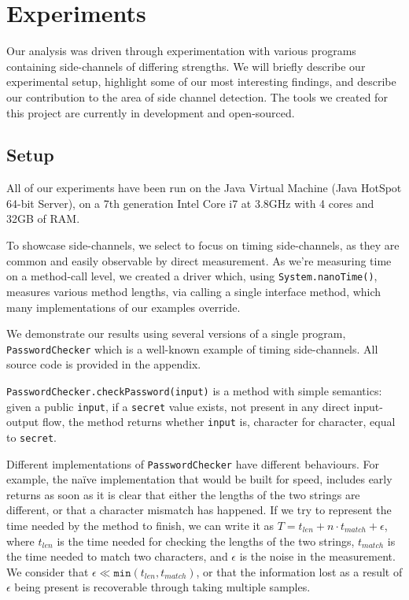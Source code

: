 \section{Experiments}

Our analysis was driven through experimentation with various programs containing side-channels of differing strengths. We will briefly describe our experimental setup, highlight some of our most interesting findings, and describe our contribution to the area of side channel detection. The tools we created for this
project are currently in development and open-sourced. 


\subsection{Setup}

All of our experiments have been run on the Java Virtual Machine (Java HotSpot 
64-bit Server), on a 7th generation Intel Core i7 at 3.8GHz with 4 cores and 32GB of RAM.

To showcase side-channels, we select to focus on timing side-channels, as they are common
and easily observable by direct measurement. As we're measuring time on a method-call level, 
we created a driver which, using \texttt{System.nanoTime()}, measures various method lengths,
via calling a single interface method, which many implementations of our examples override. 

We demonstrate our results using several versions of a single program, \texttt{PasswordChecker}
which is a well-known example of timing side-channels. All source code is provided in the appendix.

\texttt{PasswordChecker.checkPassword(input)} is a method with simple semantics: given a public 
\texttt{input}, if a \texttt{secret} value exists, not present in any direct input-output flow, the 
method returns whether \texttt{input} is, character for character, equal to \texttt{secret}.

Different implementations of \texttt{PasswordChecker} have different behaviours. For example,
the na\"ive implementation that would be built for speed, includes early returns as soon as
it is clear that either the lengths of the two strings are different, or that a character
mismatch has happened. If we try to represent the time needed by the method
to finish, we can write it as $T = t_{len} + n\cdot t_{match} + \epsilon$, where $t_{len}$ is the time needed for
checking the lengths of the two strings, $t_{match}$ is the time needed to match two characters, and $\epsilon$ is the noise in the measurement. We consider that $\epsilon \ll \texttt{min}(t_{len}, t_{match})$, or that the information lost as a result of $\epsilon$ being present is recoverable through taking multiple samples.

